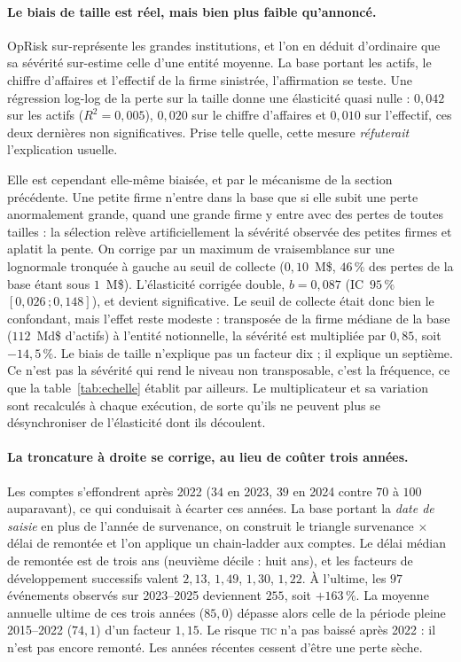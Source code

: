 \paragraph{Le biais de taille est réel, mais bien plus faible qu'annoncé.} OpRisk
sur-représente les grandes institutions, et l'on en déduit d'ordinaire que sa sévérité
sur-estime celle d'une entité moyenne. La base portant les actifs, le chiffre d'affaires et
l'effectif de la firme sinistrée, l'affirmation se teste. Une régression log-log de la perte
sur la taille donne une élasticité quasi nulle : $0{,}042$ sur les actifs
($R^2=0{,}005$), $0{,}020$ sur le chiffre d'affaires et $0{,}010$ sur l'effectif, ces deux
dernières non significatives. Prise telle quelle, cette mesure \emph{réfuterait} l'explication
usuelle.

Elle est cependant elle-même biaisée, et par le mécanisme de la section précédente. Une
petite firme n'entre dans la base que si elle subit une perte anormalement grande, quand une
grande firme y entre avec des pertes de toutes tailles : la sélection relève artificiellement
la sévérité observée des petites firmes et aplatit la pente. On corrige par un
maximum de vraisemblance sur une lognormale tronquée à gauche au seuil de collecte
($0{,}10$~M\$, $46\,\%$ des pertes de la base étant sous $1$~M\$). L'élasticité corrigée
double, $b=0{,}087$ (IC~$95\,\%$ $[0{,}026\,;0{,}148]$), et devient significative. Le seuil de
collecte était donc bien le confondant, mais l'effet reste modeste : transposée de la
firme médiane de la base ($112$~Md\$ d'actifs) à l'entité notionnelle, la sévérité est
multipliée par $0{,}85$, soit $-14{,}5\,\%$. Le biais de taille n'explique pas un facteur dix ; il
explique un septième. Ce n'est pas la sévérité qui rend le niveau non transposable,
c'est la fréquence, ce que la table~\ref{tab:echelle} établit par ailleurs. Le multiplicateur
et sa variation sont recalculés à chaque exécution, de sorte qu'ils ne peuvent plus se
désynchroniser de l'élasticité dont ils découlent.

\paragraph{La troncature à droite se corrige, au lieu de coûter trois années.} Les comptes
s'effondrent après 2022 ($34$ en 2023, $39$ en 2024 contre $70$ à $100$ auparavant), ce qui
conduisait à écarter ces années. La base portant la \emph{date de saisie} en plus de l'année
de survenance, on construit le triangle survenance $\times$ délai de remontée et l'on applique
un chain-ladder aux comptes. Le délai médian de remontée est de trois ans
(neuvième décile : huit ans), et les facteurs de développement successifs valent $2{,}13$,
$1{,}49$, $1{,}30$, $1{,}22$. À l'ultime, les $97$ événements observés sur 2023--2025
deviennent $255$, soit $+163\,\%$. La moyenne annuelle ultime de ces trois années
($85{,}0$) dépasse alors celle de la période pleine 2015--2022 ($74{,}1$) d'un facteur
$1{,}15$. Le risque \textsc{tic} n'a pas baissé après 2022 : il n'est pas encore
remonté. Les années récentes cessent d'être une perte sèche.

